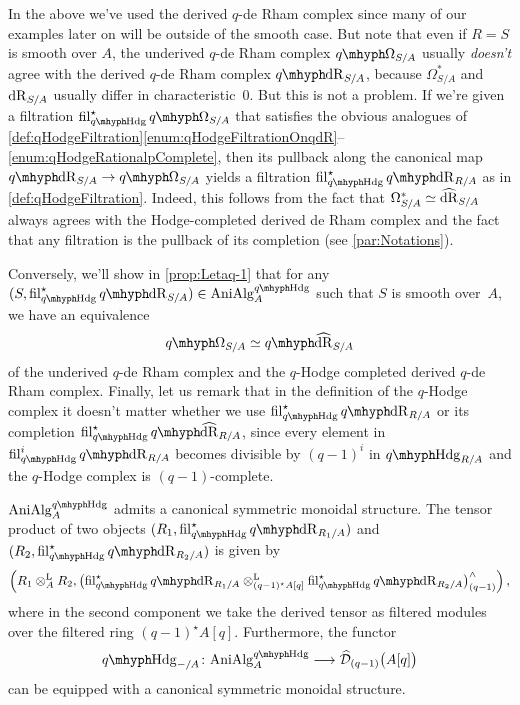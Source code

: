 \documentclass[DIV=12,numbers=enddot,leqno,bibliography=totoc]{scrartcl}
\begin{document}
	\begin{rem}\label{rem:CompleteFiltration}
		In the above we've used the derived $q$-de Rham complex since many of our examples later on will be outside of the smooth case. But note that even if $R=S$ is smooth over $A$, the underived $q$-de Rham complex $\qOmega_{S/A}$ usually \emph{doesn't} agree with the derived $q$-de Rham complex $\qdeRham_{S/A}$, because $\Omega_{S/A}^*$ and $\mathrm{dR}_{S/A}$ usually differ in characteristic~$0$. But this is not a problem. If we're given a filtration $\fil_{\qHodge}^\star \qOmega_{S/A}$ that satisfies the obvious analogues of \cref{def:qHodgeFiltration}\cref{enum:qHodgeFiltrationOnqdR}--\cref{enum:qHodgeRationalpComplete}, then its pullback along the canonical map $\qdeRham_{S/A}\rightarrow \qOmega_{S/A}$ yields a filtration $\fil_{\qHodge}^\star\qdeRham_{R/A}$ as in \cref{def:qHodgeFiltration}. Indeed, this follows from the fact that $\Omega_{S/A}^*\simeq \hatdeRham_{S/A}$ always agrees with the Hodge-completed derived de Rham complex and the fact that any filtration is the pullback of its completion (see \cref{par:Notations}).
		
		Conversely, we'll show in \cref{prop:Letaq-1} that for any  $(S,\fil_{\qHodge}^\star\qdeRham_{S/A})\in\cat{AniAlg}_A^{\qHodge}$ such that $S$ is smooth over~$A$, we have an equivalence
		\begin{equation*}
			\qOmega_{S/A}\simeq\qhatdeRham_{S/A}
		\end{equation*}
		of the underived $q$-de Rham complex and the $q$-Hodge completed derived $q$-de Rham complex. Finally, let us remark that in the definition of the $q$-Hodge complex it doesn't matter whether we use $\fil_{\qHodge}^\star\qdeRham_{R/A}$ or its completion $\fil_{\qHodge}^\star\qhatdeRham_{R/A}$, since every element in $\fil_{\qHodge}^i\qdeRham_{R/A}$ becomes divisible by $(q-1)^i$ in $\qHodge_{R/A}$ and the $q$-Hodge complex is $(q-1)$-complete.
	\end{rem}
	
	
	
	\begin{prop}\label{lem:qHodgeSymmetricMonoidal}
		$\cat{AniAlg}_A^{\qHodge}$ admits a canonical symmetric monoidal structure. The tensor product of two objects $(R_1, \fil_{\qHodge}^\star \qdeRham_{R_1/A})$ and $(R_2, \fil_{\qHodge}^\star \qdeRham_{R_2/A})$ is given by
		\begin{equation*}
			\left(R_1\lotimes_AR_2,\bigl( \fil_{\qHodge}^\star \qdeRham_{R_1/A}\lotimes_{(q-1)^\star A[q]} \fil_{\qHodge}^\star \qdeRham_{R_2/A}\bigr)_{(q-1)}^\complete\right)\,,
		\end{equation*}
		where in the second component we take the derived tensor as filtered modules over the filtered ring $(q-1)^\star A[q]$. Furthermore, the functor
		\begin{equation*}
			\qHodge_{-/A}\colon \cat{AniAlg}_A^{\qHodge}\longrightarrow \widehat{\Dd}_{(q-1)}\bigl(A[q]\bigr)
		\end{equation*}
		can be equipped with a canonical symmetric monoidal structure.
	\end{prop}
	
\end{document}
